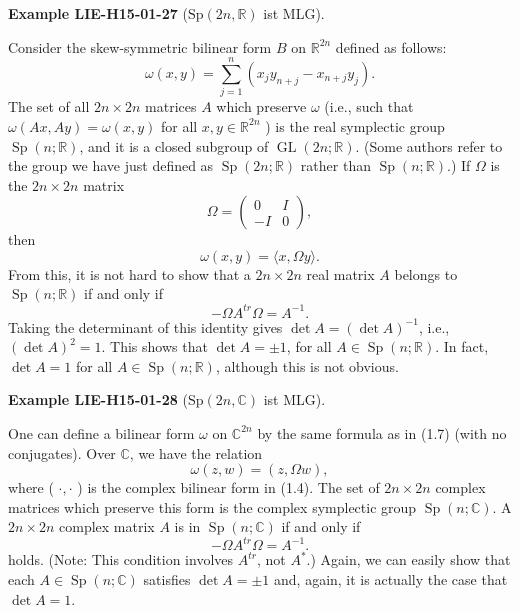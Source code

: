 \documentclass[10pt, letterpaper]{article}
\newcommand{\R}{\mathbb{R}}
\newcommand{\C}{\mathbb{C}}
\newcommand{\Sp}{\mathrm{Sp}}
\newcommand{\CustomHeading}[3]{%
  \par\medskip\noindent%
  \textbf{#1 #2} \textnormal{(#3)}.\enskip%
}
\newenvironment{EXA}[2]{\CustomHeading{Example}{#1}{#2}}{}
\begin{document}
\begin{EXA}{LIE-H15-01-27}{$\Sp(2n,\R)$ ist MLG}
Consider the skew-symmetric bilinear form $B$ on $\mathbb{R}^{2 n}$ defined as follows:
$$
\omega(x, y)=\sum_{j=1}^{n}\left(x_{j} y_{n+j}-x_{n+j} y_{j}\right) .
$$
The set of all $2 n \times 2 n$ matrices $A$ which preserve $\omega$ (i.e., such that $\omega(A x, A y)= \omega(x, y)$ for all $x, y \in \mathbb{R}^{2 n}$ ) is the real symplectic group $\operatorname{Sp}(n ; \mathbb{R})$, and it is a closed subgroup of $\operatorname{GL}(2 n ; \mathbb{R})$. (Some authors refer to the group we have just defined as $\operatorname{Sp}(2 n ; \mathbb{R})$ rather than $\operatorname{Sp}(n ; \mathbb{R})$.) If $\Omega$ is the $2 n \times 2 n$ matrix
$$
\Omega=\left(\begin{array}{cc}
0 & I \\
-I & 0
\end{array}\right),
$$
then
$$
\omega(x, y)=\langle x, \Omega y\rangle .
$$
From this, it is not hard to show that a $2 n \times 2 n$ real matrix $A$ belongs to $\operatorname{Sp}(n ; \mathbb{R})$ if and only if
$$
-\Omega A^{t r} \Omega=A^{-1} .
$$
Taking the determinant of this identity gives $\operatorname{det} A=(\operatorname{det} A)^{-1}$, i.e., $(\operatorname{det} A)^{2}=1$. This shows that $\operatorname{det} A= \pm 1$, for all $A \in \operatorname{Sp}(n ; \mathbb{R})$. In fact, $\operatorname{det} A=1$ for all $A \in \operatorname{Sp}(n ; \mathbb{R})$, although this is not obvious.
\end{EXA}

\begin{EXA}{LIE-H15-01-28}{$\Sp(2n,\C)$ ist MLG}
One can define a bilinear form $\omega$ on $\mathbb{C}^{2 n}$ by the same formula as in (1.7) (with no conjugates). Over $\mathbb{C}$, we have the relation
$$
\omega(z, w)=(z, \Omega w),
$$
where ( $\cdot, \cdot$ ) is the complex bilinear form in (1.4). The set of $2 n \times 2 n$ complex matrices which preserve this form is the complex symplectic group $\operatorname{Sp}(n ; \mathbb{C})$. A $2 n \times 2 n$ complex matrix $A$ is in $\operatorname{Sp}(n ; \mathbb{C})$ if and only if
$$
-\Omega A^{t r} \Omega=A^{-1} .
$$
holds. (Note: This condition involves $A^{t r}$, not $A^{*}$.) Again, we can easily show that each $A \in \operatorname{Sp}(n ; \mathbb{C})$ satisfies $\operatorname{det} A= \pm 1$ and, again, it is actually the case that $\operatorname{det} A=1$.
\end{EXA}
\end{document}
